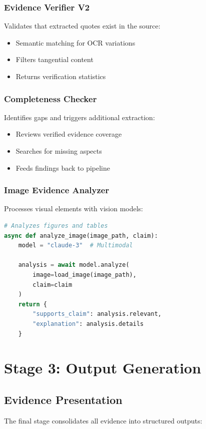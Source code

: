 \documentclass[11pt]{article}
\begin{document}
\subsubsection{Evidence Verifier V2}
Validates that extracted quotes exist in the source:
\begin{itemize}[leftmargin=*,topsep=0pt,itemsep=0pt]
\item Semantic matching for OCR variations
\item Filters tangential content
\item Returns verification statistics
\end{itemize}

\subsubsection{Completeness Checker}
Identifies gaps and triggers additional extraction:
\begin{itemize}[leftmargin=*,topsep=0pt,itemsep=0pt]
\item Reviews verified evidence coverage
\item Searches for missing aspects
\item Feeds findings back to pipeline
\end{itemize}

\subsubsection{Image Evidence Analyzer}
Processes visual elements with vision models:
\begin{lstlisting}[language=Python]
# Analyzes figures and tables
async def analyze_image(image_path, claim):
    model = "claude-3"  # Multimodal
    
    analysis = await model.analyze(
        image=load_image(image_path),
        claim=claim
    )
    return {
        "supports_claim": analysis.relevant,
        "explanation": analysis.details
    }
\end{lstlisting}

\section{Stage 3: Output Generation}

\subsection{Evidence Presentation}

The final stage consolidates all evidence into structured outputs:
\end{document}
